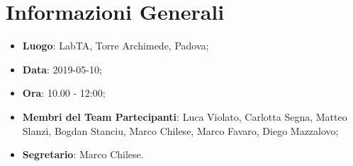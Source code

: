 \section{Informazioni Generali}
\begin{itemize}
	\item \textbf{Luogo}: LabTA, Torre Archimede, Padova; 
	\item \textbf{Data}: 2019-05-10;
	\item \textbf{Ora}: 10.00 - 12:00;
	\item \textbf{Membri del Team Partecipanti}: Luca Violato, Carlotta Segna, Matteo Slanzi, Bogdan Stanciu, Marco Chilese, Marco Favaro, Diego Mazzalovo; 
	\item \textbf{Segretario}: Marco Chilese. 
\end{itemize}


